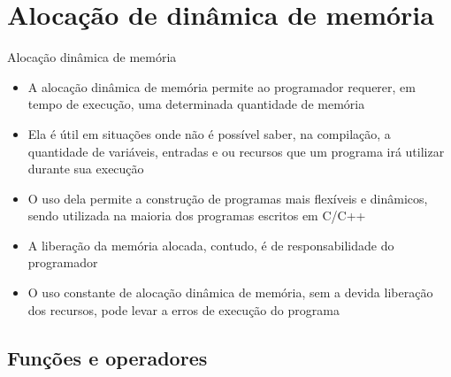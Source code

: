\section{Alocação de dinâmica de memória}

\begin{frame}[fragile]{Alocação dinâmica de memória}

	\begin{itemize}
		\item A alocação dinâmica de memória permite ao programador requerer, em tempo de execução,
         uma determinada quantidade de memória

		\item Ela é útil em situações onde não é possível saber, na compilação, a quantidade de 
        variáveis, entradas e ou recursos que um programa irá utilizar durante sua execução

		\item O uso dela permite a construção de programas mais flexíveis e dinâmicos, sendo 
        utilizada na maioria dos programas escritos em C/C++

		\item A liberação da memória alocada, contudo, é de responsabilidade do programador

		\item O uso constante de alocação dinâmica de memória, sem a devida liberação dos recursos,
        pode levar a erros de execução do programa
	\end{itemize}
	
\end{frame}

\subsection{Funções e operadores}

